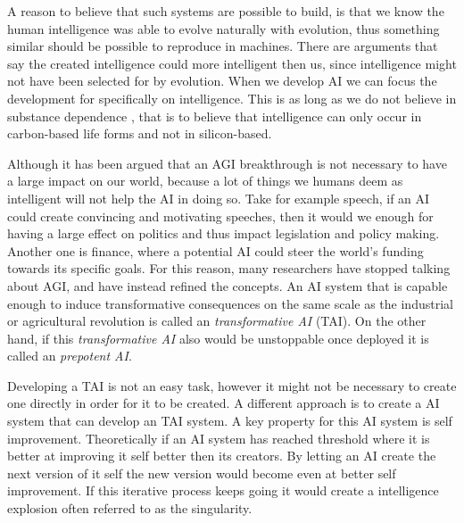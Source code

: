 \documentclass[12pt,A4]{report}
\theoremstyle{definition}
\begin{document}
A reason to believe that such systems are possible to build, is that we know the human intelligence was able to evolve naturally with evolution, thus something similar should be possible to reproduce in machines. There are arguments that say the created intelligence could more intelligent then us, since intelligence might not have been selected for by evolution\autocite{S. Legg}. When we develop AI we can focus the development for specifically on intelligence. This is as long as we do not believe in substance dependence \autocite{Bostrom (2003)}, that is to believe that intelligence can only occur in carbon-based life forms and not in silicon-based.

Although it has been argued that an AGI breakthrough is not necessary to have a large impact on our world, because a lot of things we humans deem as intelligent will not help the AI in doing so. Take for example speech, if an AI could create convincing and motivating speeches, then it would we enough for having a large effect on politics and thus impact legislation and policy making. Another one is finance, where a potential AI could steer the world's funding towards its specific goals. For this reason, many researchers have stopped talking about AGI, and have instead refined the concepts\autocite{Critch Kruger}. An AI system that is capable enough to induce transformative consequences on the same scale as the industrial or agricultural revolution is called an \textit{transformative AI} (TAI). On the other hand, if this \textit{transformative AI} also would be unstoppable once deployed it is called an \textit{prepotent AI}. 

Developing a TAI is not an easy task, however it might not be necessary to create one directly in order for it to be created\autocite{Superintelligence}. A different approach is to create a AI system that can develop an TAI system. A key property for this AI system is self improvement. Theoretically if an AI system has reached threshold where it is better at improving it self better then its creators. By letting an AI create the next version of it self the new version would become even at better self improvement. If this iterative process keeps going it would create a intelligence explosion\autocite{Yudkowsky} often referred to as the singularity.  
\end{document}
